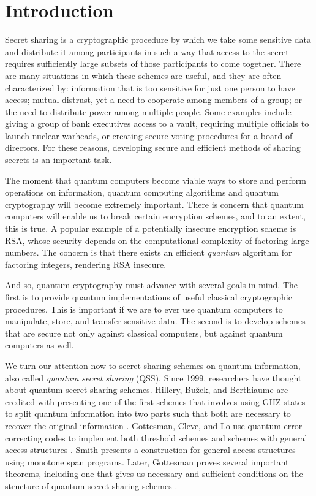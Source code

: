 \chapter{Introduction}
\label{introduction}

Secret sharing is a cryptographic procedure by which we take some sensitive data and distribute it among participants in such a way that access to the secret requires sufficiently large subsets of those participants to come together. There are many situations in which these schemes are useful, and they are often characterized by: information that is too sensitive for just one person to have access; mutual distrust, yet a need to cooperate among members of a group; or the need to distribute power among multiple people. Some examples include giving a group of bank executives access to a vault, requiring multiple officials to launch nuclear warheads, or creating secure voting procedures for a board of directors. For these reasons, developing secure and efficient methods of sharing secrets is an important task. 

The moment that quantum computers become viable ways to store and perform operations on information, quantum computing algorithms and quantum cryptography will become extremely important. There is concern that quantum computers will enable us to break certain encryption schemes, and to an extent, this is true. A popular example of a potentially insecure encryption scheme is RSA, whose security depends on the computational complexity of factoring large numbers. The concern is that there exists an efficient \textit{quantum} algorithm for factoring integers, rendering RSA insecure.

And so, quantum cryptography must advance with several goals in mind. The first is to provide quantum implementations of useful classical cryptographic procedures. This is important if we are to ever use quantum computers to manipulate, store, and transfer sensitive data. The second is to develop schemes that are secure not only against classical computers, but against quantum computers as well.

We turn our attention now to secret sharing schemes on quantum information, also called \textit{quantum secret sharing} (QSS). Since 1999, researchers have thought about quantum secret sharing schemes. Hillery, Bu\u{z}ek, and Berthiaume are credited with presenting one of the first schemes that involves using GHZ states to split quantum information into two parts such that both are necessary to recover the original information \cite{hillery_quantum_1999}. Gottesman, Cleve, and Lo use quantum error correcting codes to implement both threshold schemes and schemes with general access structures \cite{cleve_how_1999}. Smith presents a construction for general access structures using monotone span programs. Later, Gottesman proves several important theorems, including one that gives us necessary and sufficient conditions on the structure of quantum secret sharing schemes \cite{gottesman_theory_2000}.

